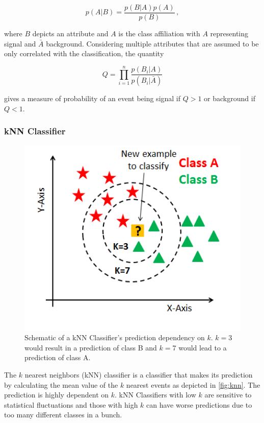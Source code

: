 \begin{equation*}
    p\left(A|B \right) = \frac{p\left(B|A \right) p\left(A \right)}{p\left(B \right)} \, ,
\end{equation*}

where $B$ depicts an attribute and $A$ is the class affiliation with $A$ representing signal and $\bar{A}$ background. Considering multiple attributes that are assumed to be only correlated with the classification, the quantity

\begin{equation*}
    Q = \prod\limits_{i = 1}^{n} \frac{p\left(B_i|A \right)}{p\left(B_i|\bar{A} \right)}
\end{equation*}

gives a measure of probability of an event being signal if $Q > 1$ or background if $Q < 1$.

\subsubsection*{kNN Classifier}

\begin{figure}[tb]
  \centering
  \includegraphics[width=12cm,keepaspectratio]{KNN_final_a1mrv9.png}
  \caption{Schematic of a kNN Classifier's prediction dependency on $k$\cite{knn}. $k=3$ would result in a prediction of class B and $k=7$ would lead to a prediction of class A.}
  \label{fig:knn}
\end{figure}

The $k$ nearest neighbors (kNN) classifier is a classifier that makes its prediction by calculating the mean value of the $k$ nearest events as depicted in \autoref{fig:knn}. The prediction is highly dependent on $k$. kNN Classifiers with low $k$ are sensitive to statistical fluctuations and those with high $k$ can have worse predictions due to too many different classes in a bunch.

